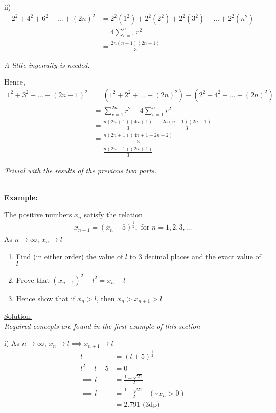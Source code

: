 \documentclass[12pt, a4paper, titlepage]{article}
\begin{document}
ii)
\begin{align*}
    2^2 + 4^2 + 6^2 + \dots + (2n)^2 &= 2^2(1^2) + 2^2(2^2) + 2^2(3^2) + \dots + 2^2(n^2) \\
    &= 4 \sum_{r = 1}^n r^2 \\
    &= \frac{2n(n + 1)(2n + 1)}{3}
\end{align*}

\emph{A little ingenuity is needed.}

Hence,
\begin{align*}
    1^2 + 3^2 + \dots + (2n - 1)^2 &= (1^2 + 2^2 + \dots + (2n)^2) - (2^2 + 4^2 + \dots + (2n)^2) \\
    &= \sum_{r = 1}^{2n} r^2 - 4 \sum_{r = 1}^n r^2 \\
    &= \frac{n(2n + 1)(4n + 1)}{3} - \frac{2n(n + 1)(2n + 1)}{3} \\
    &= \frac{n(2n + 1)(4n + 1 - 2n - 2)}{3} \\
    &= \frac{n(2n - 1)(2n + 1)}{3}
\end{align*}

\emph{Trivial with the results of the previous two parts.}

\textbf{\\ Example:}

The positive numbers $x_n$ satisfy the relation
\begin{align*}
    x_{n + 1} = (x_n + 5)^{\frac{1}{2}}, \text{ for } n = 1, 2, 3, \dots
\end{align*}
As $n \rightarrow \infty$, $x_n \rightarrow l$
\begin{enumerate}[label=(\roman*)]
    \item Find (in either order) the value of $l$ to 3 decimal places and the exact value of $l$
    \item  Prove that $(x_{n + 1})^2 - l^2 = x_n - l$
    \item Hence show that if $x_n > l$, then $x_n > x_{n + 1} > l$
\end{enumerate}

\begin{flushright}
\end{flushright}

\underline{Solution:} \\
\emph{Required concepts are found in the first example of this section}

i)
As $n \rightarrow \infty$, $x_n \rightarrow l \implies x_{n + 1} \rightarrow l$
\begin{align*}
    l &= (l + 5)^\frac{1}{2} \\
    l^2 - l - 5 &= 0 \\
    \implies l &= \frac{1 \pm \sqrt{21}}{2} \\
    \implies l &= \frac{1 + \sqrt{21}}{2} \text{ } (\because x_n > 0) \\
    &= 2.791 \text{ (3dp)}
\end{align*}
\end{document}
